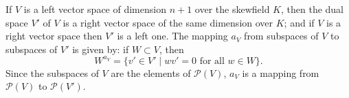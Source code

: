If $V$ is a left vector space of dimension $n+1$ over the skewfield $K$, then the dual space $V'$ of $V$ is a right vector space of the same dimension over $K$; and if $V$ is a right vector space then $V'$ is a left one. The mapping $a_V$ from subspaces of $V$ to subspaces of $V'$ is given by: if $W \subset V$, then
$$W^{a_V} = \{v' \in V' \mid w v' = 0 \text{ for all } w \in W\}.$$
Since the subspaces of $V$ are the elements of $\mathcal{P}(V)$, $a_V$ is a mapping from $\mathcal{P}(V)$ to $\mathcal{P}(V')$.
